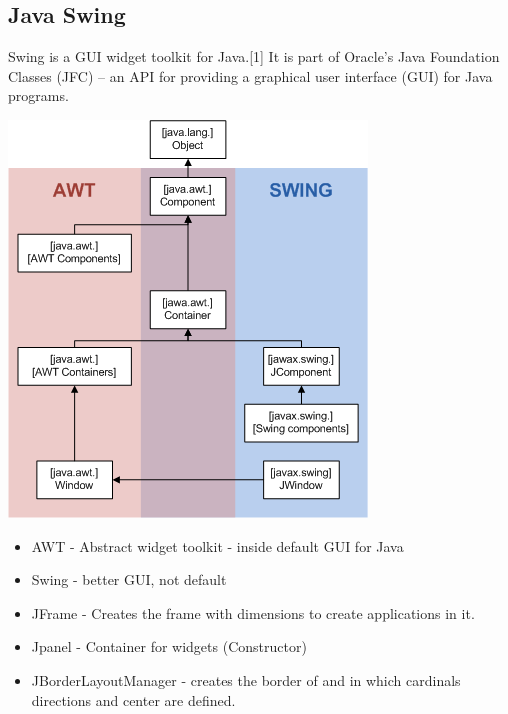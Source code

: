 \documentclass[a4paper, 11pt]{article}
\begin{document}
    \subsection{Java Swing}
        Swing is a GUI widget toolkit for Java.[1] It is part of Oracle's Java Foundation Classes (JFC) – an API for providing a graphical user interface (GUI) for Java programs.
        \begin{center}
            \includegraphics[scale=0.8]{swing}
        \end{center}
        \begin{itemize}
            \item AWT - Abstract widget toolkit - inside default GUI for Java
            \item Swing - better GUI, not default
            \item JFrame - Creates the frame with dimensions to create applications in it.
            \item Jpanel - Container for widgets (Constructor)
            \item JBorderLayoutManager - creates the border of and in which cardinals directions and center are defined.
        \end{itemize}
\end{document}
